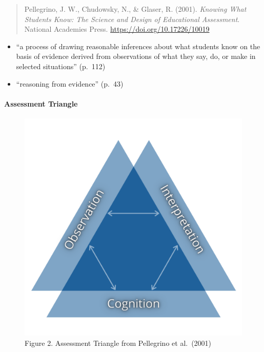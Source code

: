 \documentclass[
]{book}
\providecommand{\tightlist}{%
  \setlength{\itemsep}{0pt}\setlength{\parskip}{0pt}}
\begin{document}
\begin{quote}
Pellegrino, J. W., Chudowsky, N., \& Glaser, R. (2001). \emph{Knowing What Students Know: The Science and Design of Educational Assessment}. National Academies Press. \url{https://doi.org/10.17226/10019}
\end{quote}

\begin{itemize}
\tightlist
\item
  ``a process of drawing reasonable inferences about what students know on the basis of evidence derived from observations of what they say, do, or make in selected situations'' (p.~112)\\
\item
  ``reasoning from evidence'' (p.~43)
\end{itemize}

\hypertarget{assessment-triangle}{%
\paragraph*{Assessment Triangle}\label{assessment-triangle}}

\begin{figure}
\centering
\includegraphics{assets/otessa22/assessment-triangle.png}
\caption{Figure 2. Assessment Triangle from Pellegrino et al.~(2001)}
\end{figure}
\end{document}
